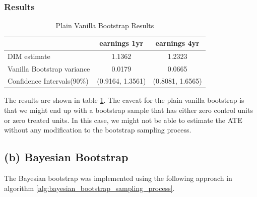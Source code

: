 \documentclass[11pt]{article}
\numberwithin{equation}{section}
\begin{document}
\subsubsection{Results}


\begin{table}[h]
    \centering
    \begin{tabular}{lcc}
        \hline
         & earnings 1yr & earnings 4yr \\
        \hline
        DIM estimate & 1.1362  & 1.2323 \\
        Vanilla Bootstrap variance & 0.0179 & 0.0665 \\
        Confidence Intervals(90\%) & (0.9164, 1.3561) & (0.8081, 1.6565) \\
        \hline
    \end{tabular}
    \caption{\label{tab:bootstrap_results}Plain Vanilla Bootstrap Results}
\end{table}

The results are shown in table \ref{tab:bootstrap_results}.
The caveat for the plain vanilla bootstrap is that we might end up with a bootstrap sample that has either zero control units or zero treated units.
In this case, we might not be able to estimate the ATE without any modification to the bootstrap sampling process.


\subsection{(b) Bayesian Bootstrap}

The Bayesian bootstrap was implemented using the following approach in algorithm \ref{alg:bayesian_bootstrap_sampling_process}.
\end{document}
